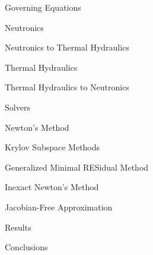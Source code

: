 \documentclass{beamer}
\begin{document}
\begin{section}{Governing Equations}
\begin{frame}{Neutronics}

\end{frame}
\begin{frame}{Neutronics to Thermal Hydraulics}

\end{frame}
\begin{frame}{Thermal Hydraulics}

\end{frame}
\begin{frame}{Thermal Hydraulics to Neutronics}

\end{frame}
\end{section}
\begin{section}{Solvers}
\begin{frame}{Newton's Method}

\end{frame}
\begin{frame}{Krylov Subspace Methods}

\end{frame}
\begin{frame}{Generalized Minimal RESidual Method}

\end{frame}
\begin{frame}{Inexact Newton's Method}

\end{frame}
\begin{frame}{Jacobian-Free Approximation}

\end{frame}
\end{section}
\begin{section}{Results}
\end{section}
\begin{section}{Conclusions}
\end{section}
\end{document}
